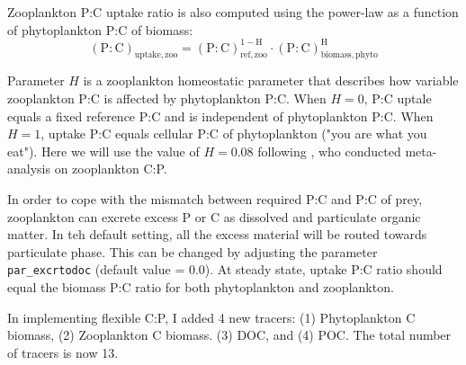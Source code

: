 \documentclass[a4paper]{article}
\begin{document}
Zooplankton P:C uptake ratio is also computed using the power-law as a function of phytoplankton P:C of biomass:
\begin{equation}
   \mathrm{(P:C)_{uptake,zoo}} = \mathrm{(P:C)_{ref,zoo}^{1-H}\cdot (P:C)_{biomass,phyto}^{H}} \label{eq:eq_pczoo}
\end{equation}

Parameter $H$ is a zooplankton homeostatic parameter that describes how variable zooplankton P:C is affected by phytoplankton P:C. When $H = 0$, P:C uptale equals a fixed reference P:C and is independent of phytoplankton P:C. When $H = 1$, uptake P:C equals cellular P:C of phytoplankton ("you are what you eat"). Here we will use the value of $H = 0.08$ following \cite{Persson10}, who conducted meta-analysis on zooplankton C:P.

In order to cope with the mismatch between required P:C and P:C of prey, zooplankton can excrete excess P or C as dissolved and particulate organic matter. In teh default setting, all the excess material will be routed towards particulate phase. This can be changed by adjusting the parameter \verb|par_excrtodoc| (default value = 0.0). At steady state, uptake P:C ratio should equal the biomass P:C ratio for both phytoplankton and zooplankton.

In implementing flexible C:P, I added 4 new tracers: (1) Phytoplankton C biomass, (2) Zooplankton C biomass. (3) DOC, and (4) POC. The total number of tracers is now 13. 
\end{document}
